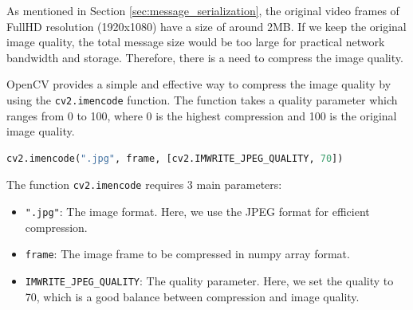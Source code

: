As mentioned in Section \ref{sec:message_serialization}, the original video frames of FullHD resolution (1920x1080) have a size of around 2MB. If we keep the original image quality, the total message size would be too large for practical network bandwidth and storage. Therefore, there is a need to compress the image quality.

OpenCV provides a simple and effective way to compress the image quality by using the \texttt{cv2.imencode} function. The function takes a quality parameter which ranges from 0 to 100, where 0 is the highest compression and 100 is the original image quality.

\begin{lstlisting}[language=python, caption={Image compression with OpenCV}]
cv2.imencode(".jpg", frame, [cv2.IMWRITE_JPEG_QUALITY, 70])
\end{lstlisting}

The function \texttt{cv2.imencode} requires 3 main parameters:
\begin{itemize}
    \item \texttt{".jpg"}: The image format. Here, we use the JPEG format for efficient compression.
    \item \texttt{frame}: The image frame to be compressed in numpy array format.
    \item \texttt{IMWRITE\_JPEG\_QUALITY}: The quality parameter. Here, we set the quality to 70, which is a good balance between compression and image quality.
\end{itemize}

